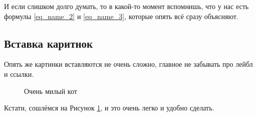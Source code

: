 \documentclass[a4paper, 12pt]{article}
\begin{document}
И если слишком долго думать, то в какой-то момент вспомнишь, что у нас есть формулы \ref{eq_name_2} и \ref{eq_name_3}, которые опять всё сразу объясняют.

\subsection{Вставка каритнок}
Опять же картинки вставляются не очень сложно, главное не забывать про лейбл и ссылки.
\begin{figure}[h]
    \caption{\label{img_cat}Очень милый кот}
\end{figure}

Кстати, сошлёмся на Рисунок \ref{img_cat}, и это очень легко и удобно сделать.
\end{document}
